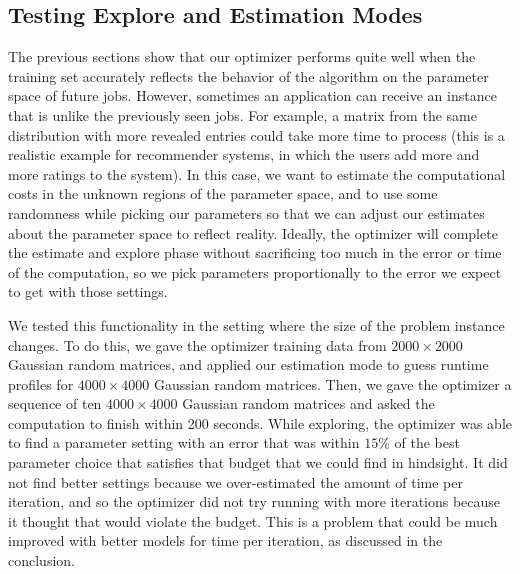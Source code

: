 \subsection{Testing Explore and Estimation Modes}
\label{sec:estEval}
The previous sections show that our optimizer performs quite well 
when the training set accurately reflects the behavior of the algorithm 
on the parameter space of future jobs. However, sometimes an 
application can receive an instance that is unlike the previously 
seen jobs. For example, a matrix from the same distribution with more
revealed entries could take more time to process (this is a realistic
example for recommender systems, in which the users add more and more
ratings to the system). In this case, we want to estimate  the computational
costs in the unknown regions of the parameter space, and to use some 
randomness while picking our parameters so that we can adjust our estimates
about the parameter space to reflect reality. 
Ideally, the optimizer will complete the estimate and explore phase 
without sacrificing too much in the error or time of the computation, 
so we pick parameters proportionally to the error we expect to get 
with those settings. 

We tested this functionality in the setting where the size of the problem
instance changes. To do this, we gave the optimizer training data from 
$2000 \times 2000$ Gaussian random matrices, and applied our estimation 
mode to guess runtime profiles for $4000 \times 4000$ Gaussian 
random matrices. Then, we gave the optimizer a sequence of 
ten $4000 \times 4000$ Gaussian random matrices and asked the 
computation to finish within 200 seconds. While exploring, 
the optimizer was able to find a parameter setting with an error 
that was within $15\%$ of the best parameter choice that satisfies 
that budget that we could find in hindsight. It did not find better 
settings because we over-estimated the amount of time per iteration, 
and so the optimizer did not try running with more iterations because 
it thought that would violate the budget. This is a problem that could be
much improved with better models for time per iteration, as discussed
in the conclusion.

